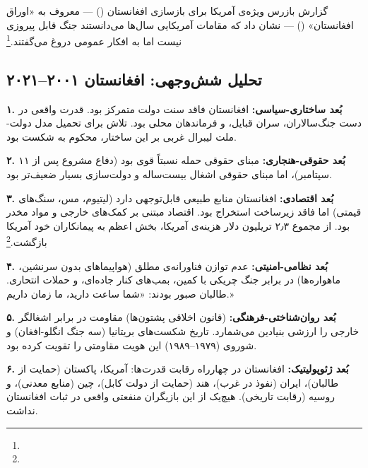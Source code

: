 گزارش بازرس ویژه‌ی آمریکا برای بازسازی افغانستان () — معروف به «اوراق افغانستان» () — نشان داد که مقامات آمریکایی سال‌ها می‌دانستند جنگ قابل پیروزی نیست اما به افکار عمومی دروغ می‌گفتند.\footnote{}

\subsection{تحلیل شش‌وجهی: افغانستان ۲۰۰۱–۲۰۲۱}
\label{subsec:ch10-afghan-hexagonal}

\begin{tcolorbox}[casebox, title={مطالعه‌ی موردی: افغانستان — تحلیل شش‌وجهی}]

\textbf{۱. بُعد ساختاری-سیاسی:}
افغانستان فاقد سنت دولت متمرکز بود. قدرت واقعی در دست جنگ‌سالاران، سران قبایل، و فرماندهان محلی بود. تلاش برای تحمیل مدل دولت-ملت لیبرال غربی بر این ساختار، محکوم به شکست بود.

\textbf{۲. بُعد حقوقی-هنجاری:}
مبنای حقوقی حمله نسبتاً قوی بود (دفاع مشروع پس از ۱۱ سپتامبر)، اما مبنای حقوقی اشغال بیست‌ساله و دولت‌سازی بسیار ضعیف‌تر بود.

\textbf{۳. بُعد اقتصادی:}
افغانستان منابع طبیعی قابل‌توجهی دارد (لیتیوم، مس، سنگ‌های قیمتی) اما فاقد زیرساخت استخراج بود. اقتصاد مبتنی بر کمک‌های خارجی و مواد مخدر بود. از مجموع ۲٫۳ تریلیون دلار هزینه‌ی آمریکا، بخش اعظم به پیمانکاران خود آمریکا بازگشت.\footnote{}

\textbf{۴. بُعد نظامی-امنیتی:}
عدم توازن فناورانه‌ی مطلق (هواپیماهای بدون سرنشین، ماهواره‌ها) در برابر جنگ چریکی با کمین، بمب‌های کنار جاده‌ای، و حملات انتحاری. طالبان صبور بودند: «شما ساعت دارید، ما زمان داریم.»

\textbf{۵. بُعد روان‌شناختی-فرهنگی:}
 (قانون اخلاقی پشتون‌ها) مقاومت در برابر اشغالگر خارجی را ارزشی بنیادین می‌شمارد. تاریخ شکست‌های بریتانیا (سه جنگ انگلو-افغان) و شوروی (۱۹۷۹–۱۹۸۹) این هویت مقاومتی را تقویت کرده بود.

\textbf{۶. بُعد ژئوپولیتیک:}
افغانستان در چهارراه رقابت قدرت‌ها: آمریکا، پاکستان (حمایت از طالبان)، ایران (نفوذ در غرب)، هند (حمایت از دولت کابل)، چین (منابع معدنی)، و روسیه (رقابت تاریخی). هیچ‌یک از این بازیگران منفعتی واقعی در ثبات افغانستان نداشت.
\end{tcolorbox}

